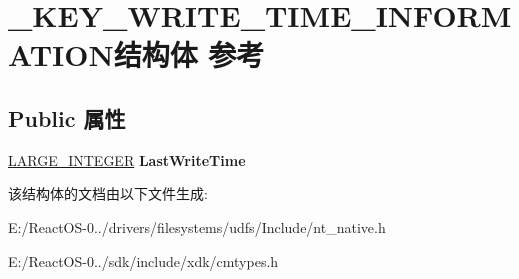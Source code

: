 \hypertarget{struct___k_e_y___w_r_i_t_e___t_i_m_e___i_n_f_o_r_m_a_t_i_o_n}{}\section{\+\_\+\+K\+E\+Y\+\_\+\+W\+R\+I\+T\+E\+\_\+\+T\+I\+M\+E\+\_\+\+I\+N\+F\+O\+R\+M\+A\+T\+I\+O\+N结构体 参考}
\label{struct___k_e_y___w_r_i_t_e___t_i_m_e___i_n_f_o_r_m_a_t_i_o_n}
\subsection*{Public 属性}
\begin{DoxyCompactItemize}
\item 
\mbox{\label{struct___k_e_y___w_r_i_t_e___t_i_m_e___i_n_f_o_r_m_a_t_i_o_n_a6dca3d62c2852dfe637784f9fd177a4e}} 
\hyperlink{union___l_a_r_g_e___i_n_t_e_g_e_r}{L\+A\+R\+G\+E\+\_\+\+I\+N\+T\+E\+G\+ER} {\bfseries Last\+Write\+Time}
\end{DoxyCompactItemize}


该结构体的文档由以下文件生成\+:\begin{DoxyCompactItemize}
\item 
E\+:/\+React\+O\+S-\/0../drivers/filesystems/udfs/\+Include/nt\+\_\+native.\+h\item 
E\+:/\+React\+O\+S-\/0../sdk/include/xdk/cmtypes.\+h\end{DoxyCompactItemize}
